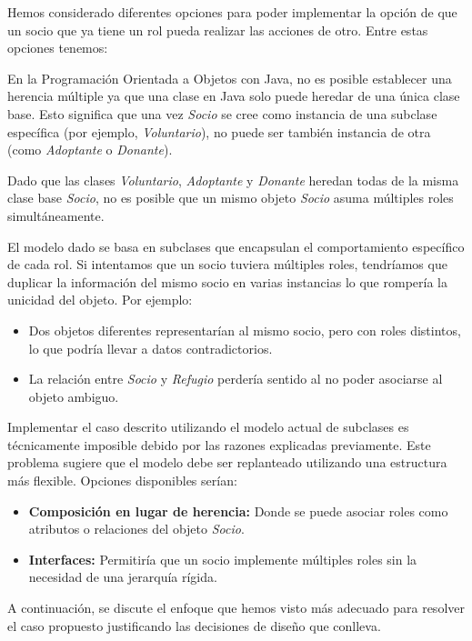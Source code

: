 
Hemos considerado diferentes opciones para poder implementar la opción de que un socio que ya tiene un rol
pueda realizar las acciones de otro. Entre estas opciones tenemos:

En la Programación Orientada a Objetos con Java, no es posible establecer 
una herencia múltiple ya que una clase en Java solo puede heredar de una 
única clase base. Esto significa que una vez \emph{Socio} se cree como 
instancia de una subclase específica (por ejemplo, \emph{Voluntario}), 
no puede ser también instancia de otra (como \emph{Adoptante} o \emph{Donante}).\par
\vspace{0.15cm}
Dado que las clases \emph{Voluntario}, \emph{Adoptante} y \emph{Donante} 
heredan todas de la misma clase base \emph{Socio}, no es posible que un 
mismo objeto \emph{Socio} asuma múltiples roles simultáneamente.\par

El modelo dado se basa en subclases que encapsulan el comportamiento 
específico de cada rol. Si intentamos que un socio tuviera múltiples roles, 
tendríamos que duplicar la información del mismo socio en varias instancias 
lo que rompería la unicidad del objeto. Por ejemplo:
\begin{itemize}
    \item Dos objetos diferentes representarían al mismo socio, pero 
    con roles distintos, lo que podría llevar a datos contradictorios.
    \item La relación entre \emph{Socio} y \emph{Refugio} perdería sentido 
    al no poder asociarse al objeto ambiguo.
\end{itemize}

Implementar el caso descrito utilizando el modelo actual de subclases es 
técnicamente imposible debido por las razones explicadas previamente. 
Este problema sugiere que el modelo debe ser replanteado utilizando una 
estructura más flexible. Opciones disponibles serían:
\begin{itemize}
    \item \textbf{Composición en lugar de herencia:} 
    Donde se puede asociar roles como atributos o relaciones del objeto \emph{Socio}.
    \item \textbf{Interfaces:} 
    Permitiría que un socio implemente múltiples roles sin la necesidad de 
    una jerarquía rígida.
\end{itemize}

A continuación, se discute el enfoque que hemos visto más adecuado para resolver 
el caso propuesto justificando las decisiones de diseño que conlleva.

\newpage